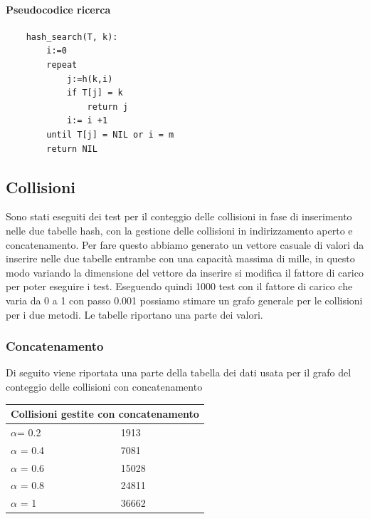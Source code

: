 \documentclass{article}
\begin{document}
\paragraph{Pseudocodice ricerca}
\begin{verbatim}
    hash_search(T, k):
        i:=0
        repeat
            j:=h(k,i)
            if T[j] = k
                return j
            i:= i +1
        until T[j] = NIL or i = m
        return NIL
\end{verbatim}

\subsection{Collisioni}
Sono stati eseguiti dei test per il conteggio delle collisioni in fase di inserimento nelle due tabelle hash, con la gestione delle collisioni in indirizzamento aperto e concatenamento. Per fare questo abbiamo generato un vettore casuale di valori da inserire nelle due tabelle entrambe con una capacità massima di mille, in questo modo variando la dimensione del vettore da inserire si modifica il fattore di carico per poter eseguire i test. Eseguendo quindi 1000 test con il fattore di carico che varia da 0 a 1 con passo 0.001 possiamo stimare un grafo generale per le collisioni per i due metodi. Le tabelle riportano una parte dei valori.
\subsubsection{Concatenamento}
Di seguito viene riportata una parte della tabella dei dati usata per il grafo del conteggio delle collisioni con concatenamento

\begin{tabular}{ |p{3cm}||p{3.5cm}|  }
 \hline
 \multicolumn{2}{|c|}{Collisioni gestite con concatenamento} \\
\hline
 $\alpha $= 0.2 & 1913\\\hline
 $\alpha $ = 0.4 & 7081    \\\hline
 $\alpha $ = 0.6 & 15028 \\\hline
 $\alpha $ = 0.8 & 24811\\\hline
 $\alpha $ = 1 & 36662  \\
 \hline
\end{tabular}
\end{document}
